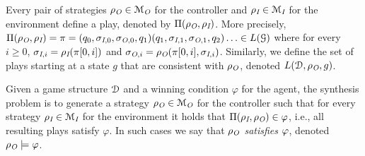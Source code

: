 Every pair of strategies $\rho_{\textit{O}} \in \mathcal{M}_{\textit{O}}$ for the controller and $\rho_{\textit{I}} \in \mathcal{M}_{\textit{I}}$ for the environment define a play, denoted by $\Pi(\rho_{\textit{O}},\rho_{\textit{I}})$. More precisely,  
$\Pi(\rho_{\textit{O}},\rho_{\textit{I}}) = \pi = (q_0,\sigma_{\textit{I},0},\sigma_{\textit{O},0}, q_1) 
(q_1,\sigma_{\textit{I},1}, \sigma_{\textit{O},1}, q_2) \ldots \in L(\mathcal{G})$
where
for every $i \geq 0$, $\sigma_{\textit{I},i} = \rho_{\textit{I}}(\pi[0,i])$ and $\sigma_{\textit{O},i} = \rho_{\textit{O}}(\pi[0,i],\sigma_{\textit{I},i})$.
Similarly, we define the set of plays starting at a state $g$ that are consistent with $\rho_{\textit{O}}$, denoted $L(\mathcal{D},\rho_{\textit{O}},g)$.

Given a game structure $\mathcal{D}$ and a winning condition $\varphi$ for the agent, the synthesis problem is to generate a strategy $\rho_{\textit{O}}\in \mathcal{M}_{\textit{O}}$ for the controller such that for every strategy $\rho_{\textit{I}} \in \mathcal{M}_{\textit{I}}$ for the environment it holds that $\Pi(\rho_{\textit{I}},\rho_{\textit{O}}) \in \varphi$, i.e., all resulting plays satisfy $\varphi$.
In such cases we say that \emph{$\rho_{\textit{O}}$ satisfies $\varphi$}, denoted $\rho_{\textit{O}}\models\varphi$.










